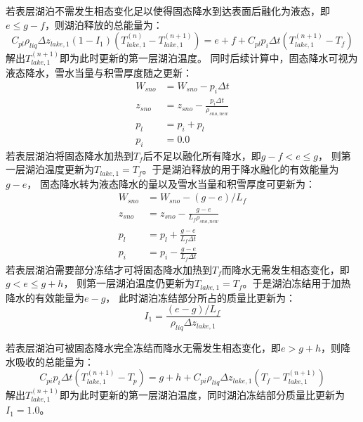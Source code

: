 若表层湖泊不需发生相态变化足以使得固态降水到达表面后融化为液态，即$e\le g-f$，则湖泊释放的总能量为：
\begin{equation}
C_{p l} \rho_{liq} \Delta z_{lake, 1}\left(1-I_{1}\right)\left(T_{lake, 1}^{(n)}-T_{lake, 1}^{(n+1)}\right)=
e+f+C_{p l} p_{i} \Delta t\left(T_{lake, 1}^{(n+1)}-T_{f}\right)
\end{equation}
解出$T_{lake,1}^{\left(n+1\right)}$即为此时更新的第一层湖泊温度。
同时后续计算中，固态降水可视为液态降水，雪水当量与积雪厚度随之更新：
\begin{equation}
\begin{aligned}
    W_{sno} &= W_{sno}-p_{i} \Delta t \\ 
    z_{sno} &= z_{sno}-\frac{p_i \Delta t}{\rho_{sno,new}} \\
    p_l &= p_i + p_l \\ 
    p_i &= 0.0
\end{aligned}
\end{equation}
若表层湖泊将固态降水加热到$T_f$后不足以融化所有降水，即$g-f<e\le g$，
则第一层湖泊温度更新为$T_{lake,1}=T_f$。于是湖泊释放的用于降水融化的有效能量为$g-e$，
固态降水转为液态降水的量以及雪水当量和积雪厚度可更新为：
\begin{equation}
\begin{aligned}
    W_{sno} &= W_{sno}-(g-e) / L_{f} \\ 
    z_{sno} &= z_{sno}-\frac{g-e}{L_f \rho_{sno,new}} \\
    p_{l} &= p_{l}+\frac{g-e}{L_f \Delta t} \\ 
    p_{i} &= p_{i}-\frac{g-e}{L_f \Delta t}
\end{aligned}
\end{equation}
若表层湖泊需要部分冻结才可将固态降水加热到$T_f$而降水无需发生相态变化，即$g<e\le g+h$，
则第一层湖泊温度仍更新为$T_{lake,1}=T_f$。于是湖泊冻结用于加热降水的有效能量为$e-g$，
此时湖泊冻结部分所占的质量比更新为：
\begin{equation}
I_{1}=\frac{(e-g) / L_{f}}{\rho_{liq} \Delta z_{lake, 1}}
\end{equation}

若表层湖泊可被固态降水完全冻结而降水无需发生相态变化，即$e>g+h$，则降水吸收的总能量为：
\begin{equation}
C_{p i} p_{i} \Delta t\left(T_{lake, 1}^{(n+1)}-T_{p}\right)=g+h+C_{p i} \rho_{liq} \Delta z_{lake, 1}
\left(T_{f}-T_{lake,1}^{(n+1)}\right)
\end{equation}
解出$T_{lake,1}^{\left(n+1\right)}$即为此时更新的第一层湖泊温度，同时湖泊冻结部分质量比更新为$I_1=1.0$。


